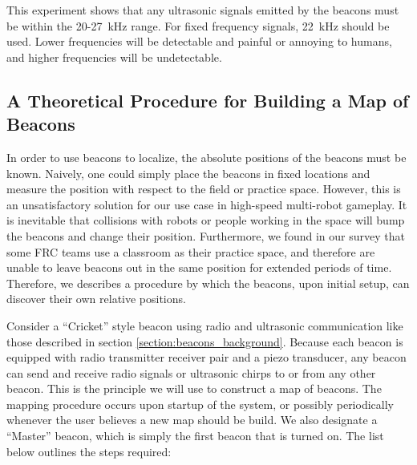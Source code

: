 \documentclass{article}
\begin{document}
    This experiment shows that any ultrasonic signals emitted by the beacons must be within the 20-27\SI{}{\kilo\hertz} range. For fixed frequency signals, \SI{22}{\kilo\hertz} should be used. Lower frequencies will be detectable and painful or annoying to humans, and higher frequencies will be undetectable.

  \subsection{A Theoretical Procedure for Building a Map of Beacons} \label{section:beacon_self_localization}

    In order to use beacons to localize, the absolute positions of the beacons must be known. Naively, one could simply place the beacons in fixed locations and measure the position with respect to the field or practice space. However, this is an unsatisfactory solution for our use case in high-speed multi-robot gameplay. It is inevitable that collisions with robots or people working in the space will bump the beacons and change their position. Furthermore, we found in our survey that some FRC teams use a classroom as their practice space, and therefore are unable to leave beacons out in the same position for extended periods of time. Therefore, we describes a procedure by which the beacons, upon initial setup, can discover their own relative positions.

    Consider a ``Cricket'' style beacon using radio and ultrasonic communication like those described in section \ref{section:beacons_background}. Because each beacon is equipped with radio transmitter receiver pair and a piezo transducer, any beacon can send and receive radio signals or ultrasonic chirps to or from any other beacon. This is the principle we will use to construct a map of beacons. The mapping procedure occurs upon startup of the system, or possibly periodically whenever the user believes a new map should be build. We also designate a ``Master'' beacon, which is simply the first beacon that is turned on. The list below outlines the steps required:
\end{document}
